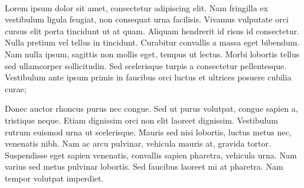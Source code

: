 \paragraph{}
Lorem ipsum dolor sit amet, consectetur adipiscing elit. Nam fringilla ex vestibulum ligula feugiat, non consequat urna facilisis. Vivamus vulputate orci cursus elit porta tincidunt ut at quam. Aliquam hendrerit id risus id consectetur. Nulla pretium vel tellus in tincidunt. Curabitur convallis a massa eget bibendum. Nam nulla ipsum, sagittis non mollis eget, tempus ut lectus. Morbi lobortis tellus sed ullamcorper sollicitudin. Sed scelerisque turpis a consectetur pellentesque. Vestibulum ante ipsum primis in faucibus orci luctus et ultrices posuere cubilia curae;

Donec auctor rhoncus purus nec congue. Sed ut purus volutpat, congue sapien a, tristique neque. Etiam dignissim orci non elit laoreet dignissim. Vestibulum rutrum euismod urna ut scelerisque. Mauris sed nisi lobortis, luctus metus nec, venenatis nibh. Nam ac arcu pulvinar, vehicula mauris at, gravida tortor. Suspendisse eget sapien venenatis, convallis sapien pharetra, vehicula urna. Nam varius sed metus pulvinar lobortis. Sed faucibus laoreet mi at pharetra. Nam tempor volutpat imperdiet.